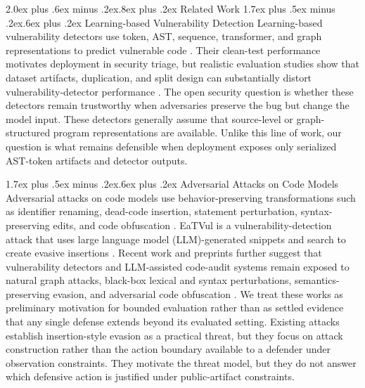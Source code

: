 \documentclass[letterpaper,twocolumn,10pt,twoside]{article}
\makeatletter
\renewcommand\section{\@startsection{section}{1}{\z@}%
  {2.0ex plus .6ex minus .2ex}{.8ex plus .2ex}%
  {\normalfont\large\bfseries}}
\renewcommand\subsection{\@startsection{subsection}{2}{\z@}%
  {1.7ex plus .5ex minus .2ex}{.6ex plus .2ex}%
  {\normalfont\normalsize\bfseries}}
\makeatother
\begin{document}
\section{Related Work}
\subsection{Learning-based Vulnerability Detection}
Learning-based vulnerability detectors use token, AST, sequence, transformer, and graph representations to predict vulnerable code \cite{li2018vuldeepecker,zhou2019devign,fu2022linevul,feng2020codebert,guo2021graphcodebert}. Their clean-test performance motivates deployment in security triage, but realistic evaluation studies show that dataset artifacts, duplication, and split design can substantially distort vulnerability-detector performance \cite{chakraborty2020arewe,ding2024primevul}. The open security question is whether these detectors remain trustworthy when adversaries preserve the bug but change the model input. These detectors generally assume that source-level or graph-structured program representations are available. Unlike this line of work, our question is what remains defensible when deployment exposes only serialized AST-token artifacts and detector outputs.

\subsection{Adversarial Attacks on Code Models}
Adversarial attacks on code models use behavior-preserving transformations such as identifier renaming, dead-code insertion, statement perturbation, syntax-preserving edits, and code obfuscation \cite{yefet2020adversarial,chen2022natural,zhou2023advulcode,ramakrishnan2020adversarial,rabin2020generalizability,srikant2021optimized}. EaTVul is a vulnerability-detection attack that uses large language model (LLM)-generated snippets and search to create evasive insertions \cite{liu2024eatvul}. Recent work and preprints further suggest that vulnerability detectors and LLM-assisted code-audit systems remain exposed to natural graph attacks, black-box lexical and syntax perturbations, semantics-preserving evasion, and adversarial code obfuscation \cite{natgvd2025,li2025cotdeceptor,yang2026hogvul,sun2026syntax,llmobfuscation2025}. We treat these works as preliminary motivation for bounded evaluation rather than as settled evidence that any single defense extends beyond its evaluated setting. Existing attacks establish insertion-style evasion as a practical threat, but they focus on attack construction rather than the action boundary available to a defender under observation constraints. They motivate the threat model, but they do not answer which defensive action is justified under public-artifact constraints.
\end{document}

